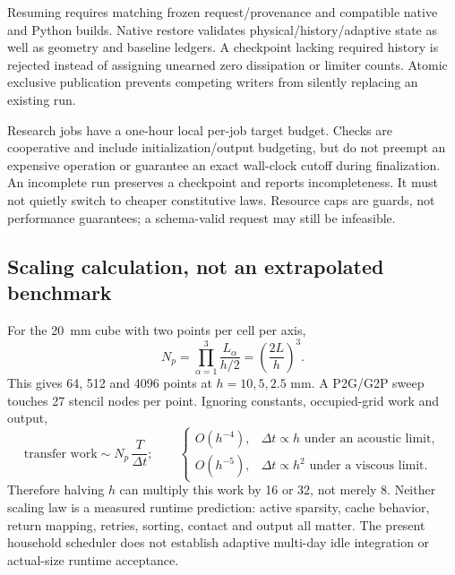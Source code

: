 \documentclass[11pt,a4paper]{article}
\numberwithin{equation}{section}
\begin{document}
Resuming requires matching frozen request/provenance and compatible native and
Python builds. Native restore validates physical/history/adaptive state as well
as geometry and baseline ledgers. A checkpoint lacking required history is
rejected instead of assigning unearned zero dissipation or limiter counts.
Atomic exclusive publication prevents competing writers from silently replacing
an existing run.

Research jobs have a one-hour local per-job target budget. Checks are cooperative
and include initialization/output budgeting, but do not preempt an expensive
operation or guarantee an exact wall-clock cutoff during finalization. An
incomplete run preserves a checkpoint and reports incompleteness. It must not
quietly switch to cheaper constitutive laws. Resource caps are guards, not
performance guarantees; a schema-valid request may still be infeasible.

\subsection{Scaling calculation, not an extrapolated benchmark}
For the \SI{20}{mm} cube with two points per cell per axis,
\begin{equation}
 N_p=\prod_{\alpha=1}^3\frac{L_\alpha}{h/2}
       =\left(\frac{2L}{h}\right)^3.
\end{equation}
This gives 64, 512 and 4096 points at $h=10,5,2.5$ mm. A P2G/G2P sweep touches
27 stencil nodes per point. Ignoring constants, occupied-grid work and output,
\begin{equation}
 \text{transfer work}\sim N_p\,\frac{T}{\Delta t};\qquad
 \begin{cases}
 O(h^{-4}),&\Delta t\propto h\text{ under an acoustic limit},\\
 O(h^{-5}),&\Delta t\propto h^2\text{ under a viscous limit}.
 \end{cases}
\end{equation}
Therefore halving $h$ can multiply this work by 16 or 32, not merely 8.
Neither scaling law is a measured runtime prediction: active sparsity, cache
behavior, return mapping, retries, sorting, contact and output all matter.
The present household scheduler does not establish adaptive multi-day idle
integration or actual-size runtime acceptance.
\end{document}
